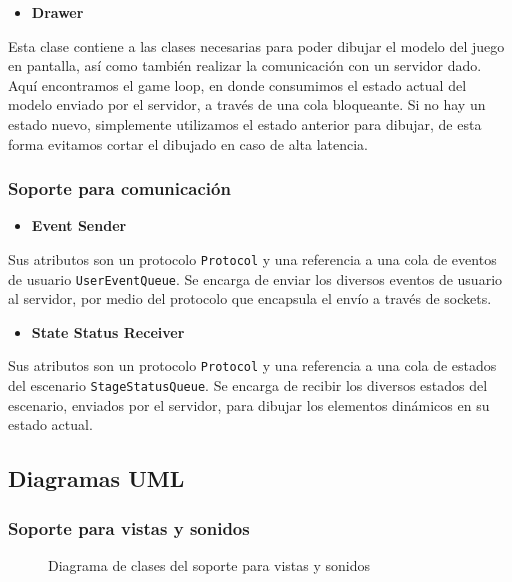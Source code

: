 \documentclass[a4paper]{article}
\begin{document}
\begin{itemize}
	\item \textbf{Drawer}
\end{itemize}

Esta clase contiene a las clases necesarias para poder dibujar el modelo del juego en pantalla, así como también realizar la comunicación con un servidor dado.
Aquí encontramos el game loop, en donde consumimos el estado actual del modelo enviado por el servidor, a través de una cola bloqueante. Si no hay un estado nuevo, simplemente utilizamos el estado anterior para dibujar, de esta forma evitamos cortar el dibujado en caso de alta latencia.

\subsubsection{Soporte para comunicación}

\begin{itemize}
	\item \textbf{Event Sender}
\end{itemize}

Sus atributos son un protocolo \texttt{Protocol} y una referencia a una cola de eventos de usuario \texttt{UserEventQueue}. Se encarga de enviar los diversos eventos de usuario al servidor, por medio del protocolo que encapsula el envío a través de sockets.

\begin{itemize}
	\item \textbf{State Status Receiver}
\end{itemize}

Sus atributos son un protocolo \texttt{Protocol} y una referencia a una cola de estados del escenario \texttt{StageStatusQueue}. Se encarga de recibir los diversos estados del escenario, enviados por el servidor, para dibujar los elementos dinámicos en su estado actual.

\newpage

\subsection{Diagramas UML}

\subsubsection{Soporte para vistas y sonidos}

\begin{figure}[!h]
	\caption{Diagrama de clases del soporte para vistas y sonidos}
	\label{fig:diagram6}
\end{figure}
\end{document}
